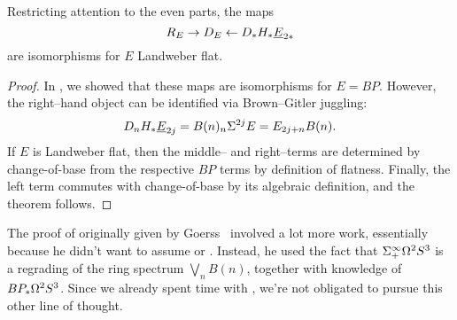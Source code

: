 \begin{theorem}\label{LandweberFlatUnstableCoopns}
Restricting attention to the even parts, the maps \[R_E \to D_E \leftarrow D_* H_* \underline{\smash{E}}_{2*}\] are isomorphisms for $E$ Landweber flat.
\end{theorem}
\begin{proof}
In , we showed that these maps are isomorphisms for $E = BP$.  However, the right--hand object can be identified via Brown--Gitler juggling: \[D_n H_* \underline{\smash{E}}_{2j} = B(n)_n \Sigma^{2j} E = E_{2j+n} B(n).\]  If $E$ is Landweber flat, then the middle-- and right--terms are determined by change-of-base from the respective $BP$ terms by definition of flatness.  Finally, the left term commutes with change-of-base by its algebraic definition, and the theorem follows.
\end{proof}

\begin{remark}
The proof of  originally given by Goerss~\cite{GoerssDieudonne} involved a lot more work, essentially because he didn't want to assume  or .  Instead, he used the fact that $\Sigma^\infty_+ \Omega^2 S^3$ is a regrading of the ring spectrum $\bigvee_n B(n)$, together with knowledge of $BP_* \Omega^2 S^3$.  Since we already spent time with , we're not obligated to pursue this other line of thought.
\end{remark}

